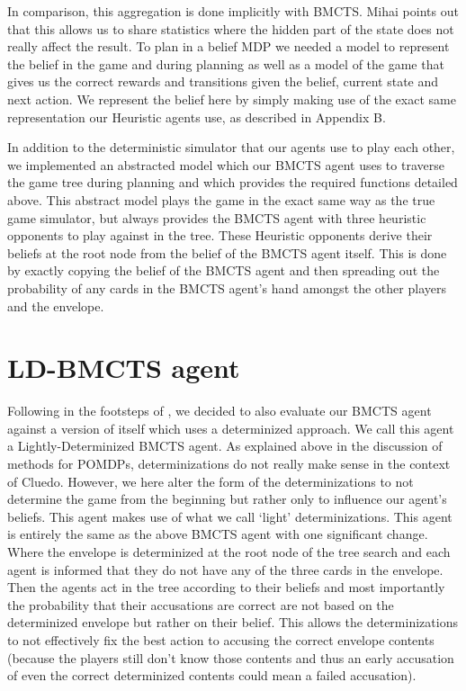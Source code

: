\documentclass[msc, deptreport, ai, romanprepages]{infthesis}
\begin{document}
In comparison, this aggregation is done implicitly with BMCTS. Mihai points out that this allows us to share statistics where the hidden part of the state does not really affect the result. To plan in a belief MDP we needed a model to represent the belief in the game and during planning as well as a model of the game that gives us the correct rewards and transitions given the belief, current state and next action. We represent the belief here by simply making use of the exact same representation our Heuristic agents use, as described in Appendix B. 

In addition to the deterministic simulator that our agents use to play each other, we implemented an abstracted model which our BMCTS agent uses to traverse the game tree during planning and which provides the required functions detailed above. This abstract model plays the game in the exact same way as the true game simulator, but always provides the BMCTS agent with three heuristic opponents to play against in the tree. These Heuristic opponents derive their beliefs at the root node from the belief of the BMCTS agent itself. This is done by exactly copying the belief of the BMCTS agent and then spreading out the probability of any cards in the BMCTS agent’s hand amongst the other players and the envelope. 

\section{LD-BMCTS agent}
Following in the footsteps of \cite{Mihai}, we decided to also evaluate our BMCTS agent against a version of itself which uses a determinized approach. We call this agent a Lightly-Determinized BMCTS agent. As explained above in the discussion of methods for POMDPs, determinizations do not really make sense in the context of Cluedo. However, we here alter the form of the determinizations to not determine the game from the beginning but rather only to influence our agent’s beliefs. This agent makes use of what we call `light' determinizations.
This agent is entirely the same as the above BMCTS agent with one significant change. Where the envelope is determinized at the root node of the tree search and each agent is informed that they do not have any of the three cards in the envelope. Then the agents act in the tree according to their beliefs and most importantly the probability that their accusations are correct are not based on the determinized envelope but rather on their belief. This allows the determinizations to not effectively fix the best action to accusing the correct envelope contents (because the players still don't know those contents and thus an early accusation of even the correct determinized contents could mean a failed accusation).
\end{document}
